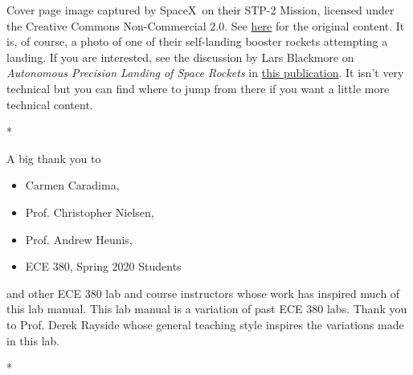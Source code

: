 \documentclass[letterpaper, 12pt, oneside]{memoir}
\begin{document}
\noindent
Cover page image captured by SpaceX\textregistered~on their STP-2 Mission, licensed under the Creative Commons Non-Commercial 2.0.
See \href{https://www.flickr.com/photos/spacex/48129269942/}{here} for the original content.
It is, of course, a photo of one of their self-landing booster rockets attempting a landing.
If you are interested, see the discussion by Lars Blackmore on \emph{Autonomous Precision Landing of Space Rockets} in \href{http://www.larsblackmore.com/nae_bridge_2016.pdf}{this publication}.
It isn't very technical but you can find where to jump from there if you want a little more technical content.
\begin{center}
  * \qquad * \qquad *
\end{center}
\noindent
A big thank you to
\begin{itemize}[label={}]
  \item{Carmen Caradima,}
  \item{Prof. Christopher Nielsen,}
  \item{Prof. Andrew Heunis,}
  \item{ECE 380, Spring 2020 Students}
\end{itemize}
and other ECE 380 lab and course instructors whose work has inspired much
of this lab manual.
This lab manual is a variation of past ECE 380 labs.
Thank you to Prof. Derek Rayside whose general teaching style inspires the variations made in this lab.
\begin{center}
  * \qquad * \qquad *
\end{center}

\pagebreak

\frontmatter

\tableofcontents*
\thispagestyle{empty}

\clearpage
\listoffigures*

\clearpage
\listoftables*

%


\mainmatter







\appendix



\backmatter
\end{document}
